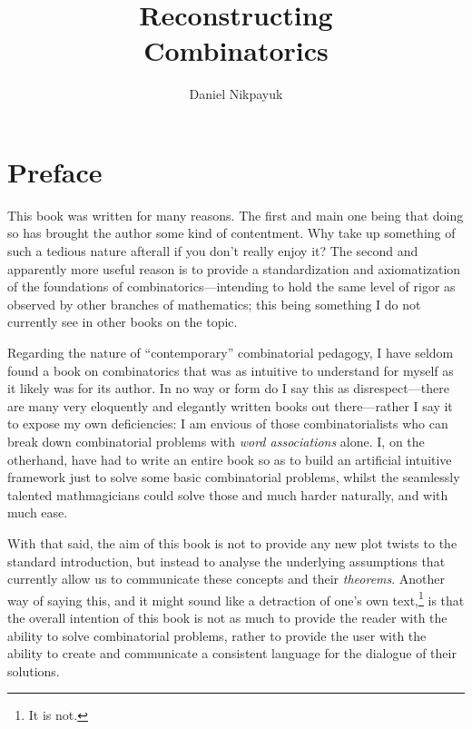 \documentclass[twoside]{book}
\title{\Huge\bfseries Reconstructing \\ Combinatorics}
\author{Daniel Nikpayuk}
\date{}
\begin{document}
\maketitle\frontmatter

\pagestyle{headings}\tableofcontents
{}

\chapter{Preface}

This book was written for many reasons.  The first and main one being that doing so has brought the author
some kind of contentment.  Why take up something of such a tedious nature afterall if you don't really enjoy it?
The second and apparently more useful reason is to provide a standardization and axiomatization of the foundations
of combinatorics---intending to hold the same level of rigor as observed by other branches of mathematics; this being
something I do not currently see in other books on the topic.

Regarding the nature of ``contemporary'' combinatorial pedagogy, I have seldom found a book on combinatorics
that was as intuitive to understand for myself as it likely was for its author.  In no way or form do I say this as
disrespect---there are many very eloquently and elegantly written books out there---rather I say it to expose my own
deficiencies:  I am envious of those combinatorialists who can break down combinatorial problems with \emph{word
associations} alone.  I, on the otherhand, have had to write an entire book so as to build an artificial intuitive
framework just to solve some basic combinatorial problems, whilst the seamlessly talented mathmagicians could solve
those and much harder naturally, and with much ease.

With that said, the aim of this book is not to provide any new plot twists to the standard introduction, but
instead to analyse the underlying assumptions that currently allow us to communicate these concepts and their
\emph{theorems}.  Another way of saying this, and it might sound like a detraction of one's own
text,\footnote{It is not.} is that the overall intention of this book is not as much to provide the reader with
the ability to solve combinatorial problems, rather to provide the user with the ability to create and communicate
a consistent language for the dialogue of their solutions.
\end{document}
